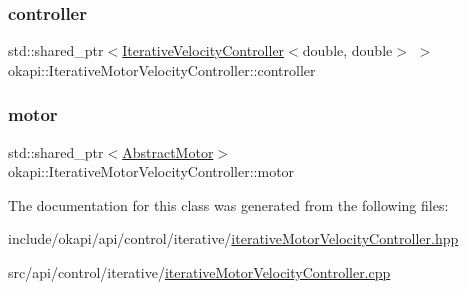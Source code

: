 \subsubsection{\texorpdfstring{controller}{controller}}
{\footnotesize\ttfamily std\+::shared\+\_\+ptr$<$\mbox{\hyperlink{classokapi_1_1IterativeVelocityController}{Iterative\+Velocity\+Controller}}$<$double, double$>$ $>$ okapi\+::\+Iterative\+Motor\+Velocity\+Controller\+::controller\hspace{0.3cm}{\ttfamily [protected]}}

\mbox{\label{classokapi_1_1IterativeMotorVelocityController_a155aefa9df71ea938c1395d25089442d}} 
\subsubsection{\texorpdfstring{motor}{motor}}
{\footnotesize\ttfamily std\+::shared\+\_\+ptr$<$\mbox{\hyperlink{classokapi_1_1AbstractMotor}{Abstract\+Motor}}$>$ okapi\+::\+Iterative\+Motor\+Velocity\+Controller\+::motor\hspace{0.3cm}{\ttfamily [protected]}}



The documentation for this class was generated from the following files\+:\begin{DoxyCompactItemize}
\item 
include/okapi/api/control/iterative/\mbox{\hyperlink{iterativeMotorVelocityController_8hpp}{iterative\+Motor\+Velocity\+Controller.\+hpp}}\item 
src/api/control/iterative/\mbox{\hyperlink{iterativeMotorVelocityController_8cpp}{iterative\+Motor\+Velocity\+Controller.\+cpp}}\end{DoxyCompactItemize}
